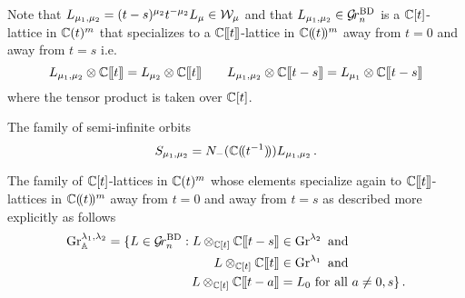 \documentclass{article}
\begin{document}

Note that $ L_{\mu_1, \mu_2} = (t-s)^{\mu_2} t^{-\mu_2} L_{\mu} \in \cW_\mu$ 
and that  $L_{\mu_1,\mu_2}\in\Grbd$  is a $\CC[t]$-lattice in $\CC(t)^m$ that specializes to a $\CC\xt$-lattice in $\CC\xT^m$ away from $t = 0$ and away from $t = s$  i.e.\
\begin{equation}
    \label{eq:defWBD}
        L_{\mu_1,\mu_2}\otimes \CC\xt = L_{\mu_2} \otimes \CC\xt \qquad
        L_{\mu_1,\mu_2}\otimes \CC\xt[t-s] = L_{\mu_1} \otimes \CC\xt[t-s]
\end{equation}
where 
the tensor product is taken over $\CC[t]$. 
% 

The family of semi-infinite orbits 
\begin{equation}
    S_{\mu_1,\mu_2} = N_-(\CC\xT[t^{-1}]) L_{\mu_1,\mu_2}\,. 
\end{equation}

The family  of $\CC[t]$-lattices in $\CC(t)^m$ whose elements specialize again to $\CC\xt$-lattices in $\CC\xT^m$ away from $t = 0$ and away from $t = s$ as described more explicitly as follows
\begin{equation}
    \label{eq:defGrBDlambda}
    \begin{split}
        \Gr_{\AA}^{\lambda_1,\lambda_2} = 
        \{L \in\Grbd : 
        L \otimes_{\CC[t]} \CC\xt[t-s] 
        &\in \Gr^{\lambda_2} \text{ and } \\
        L\otimes_{\CC[t]} \CC\xt &\in \Gr^{\lambda_1} \text{ and } \\ 
        L \otimes_{\CC[t]} \CC\xt[t-a] &= L_0 \text{ for all $ a \ne 0, s$} \}\,.
    \end{split}
\end{equation}
\end{document}
